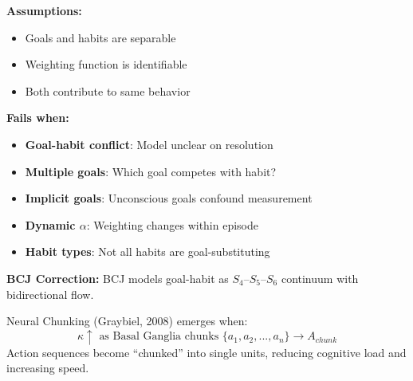 \begin{tcolorbox}[colback=red!5!white, colframe=red!75!black, title=Boundary Condition: Where Goal-Habit Model Fails]
\textbf{Assumptions:}
\begin{itemize}[nosep]
\item Goals and habits are separable
\item Weighting function is identifiable
\item Both contribute to same behavior
\end{itemize}

\textbf{Fails when:}
\begin{itemize}[nosep]
\item \textbf{Goal-habit conflict}: Model unclear on resolution
\item \textbf{Multiple goals}: Which goal competes with habit?
\item \textbf{Implicit goals}: Unconscious goals confound measurement
\item \textbf{Dynamic $\alpha$}: Weighting changes within episode
\item \textbf{Habit types}: Not all habits are goal-substituting
\end{itemize}

\textbf{BCJ Correction:} BCJ models goal-habit as $S_4$--$S_5$--$S_6$ continuum with bidirectional flow.
\end{tcolorbox}


\begin{theorem}
\label{thm:chunking}
Neural Chunking (Graybiel, 2008) emerges when:
\begin{equation}
\boxed{\kappa \uparrow \text{ as Basal Ganglia chunks } \{a_1, a_2, ..., a_n\} \to A_{chunk}}
\end{equation}
Action sequences become ``chunked'' into single units, reducing cognitive load and increasing speed.
\end{theorem}

